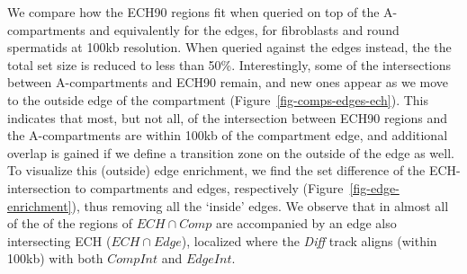 \documentclass[
  11pt,
  a4paper,
]{scrbook}
\begin{document}
We compare how the ECH90 regions fit when queried on top of the
A-compartments and equivalently for the edges, for fibroblasts and round
spermatids at 100kb resolution. When queried against the edges instead,
the the total set size is reduced to less than 50\%. Interestingly, some
of the intersections between A-compartments and ECH90 remain, and new
ones appear as we move to the outside edge of the compartment
(Figure~\ref{fig-comps-edges-ech}). This indicates that most, but not
all, of the intersection between ECH90 regions and the A-compartments
are within 100kb of the compartment edge, and additional overlap is
gained if we define a transition zone on the outside of the edge as
well. To visualize this (outside) edge enrichment, we find the set
difference of the ECH-intersection to compartments and edges,
respectively (Figure~\ref{fig-edge-enrichment}), thus removing all the
`inside' edges. We observe that in almost all of the of the regions of
\(ECH \cap Comp\) are accompanied by an edge also intersecting ECH
(\(ECH \cap Edge\)), localized where the \emph{Diff} track aligns
(within 100kb) with both \(CompInt\) and \(EdgeInt\).
\end{document}
